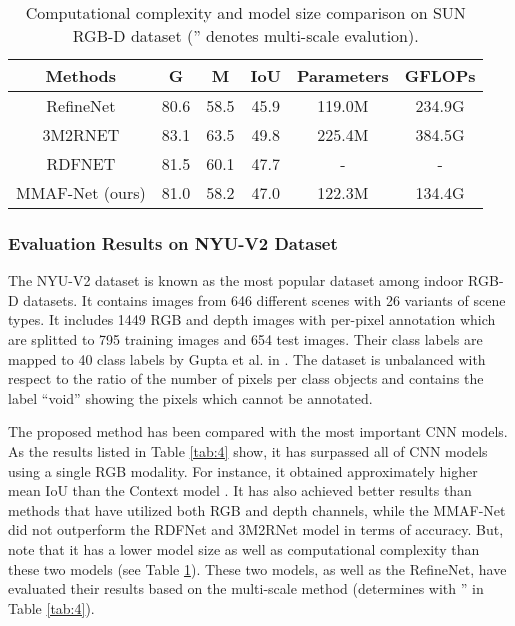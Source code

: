 \documentclass[journal,transmag]{IEEEtran}
\begin{document}
\begin{table}
	\centering
	\caption{Computational complexity and model size comparison on SUN RGB-D dataset ('' denotes multi-scale evalution).}
	\label{tab:3}
	\begin{tabular}{|c|c|c|c|c|c|}
		\hline
		Methods	&	G &	M&	IoU	& Parameters & GFLOPs \\
		\hline
		RefineNet \cite{lin2017refinenet}&80.6&	58.5&	45.9&119.0M & 234.9G\\ 
		\hline
		3M2RNET \cite{fooladgar20193m2rnet} &		83.1&	63.5&	49.8&225.4M&384.5G\\
		\hline
		RDFNET \cite{park2017rdfnet} &81.5&	60.1&47.7&	-&-\\
		\hline
		MMAF-Net (ours) &81.0	&58.2	&47.0	& 122.3M&134.4G\\
		\hline			
	\end{tabular}
\end{table}



\subsubsection{Evaluation Results on NYU-V2 Dataset} 
The NYU-V2 dataset is known as the most popular dataset among indoor RGB-D datasets. It contains images from 646 different scenes with 26 variants  of scene types. It includes 1449 RGB and depth images with per-pixel annotation which are splitted to 795 training images and 654 test images. Their class labels are mapped to 40 class labels by Gupta et al. in \cite{gupta2013perceptual}. The dataset is unbalanced with respect to the ratio of the number of pixels per class objects and contains the label “void” showing the pixels which cannot be annotated. 

The proposed method has been compared with the most important CNN models.  As the results listed in Table \ref{tab:4}  show, it has surpassed all of CNN models using a single RGB modality. For instance, it obtained approximately   higher mean IoU than the Context model  \cite{lin2018exploring}. It has also achieved better results than methods that have utilized both RGB and depth channels, while the MMAF-Net did not outperform the RDFNet and 3M2RNet model in terms of accuracy. But, note that it has a lower model size as well as computational complexity than these two models (see Table \ref{tab:3}). These two models, as well as the RefineNet, have evaluated their results based on the multi-scale method (determines with '' in Table \ref{tab:4}).
\end{document}
